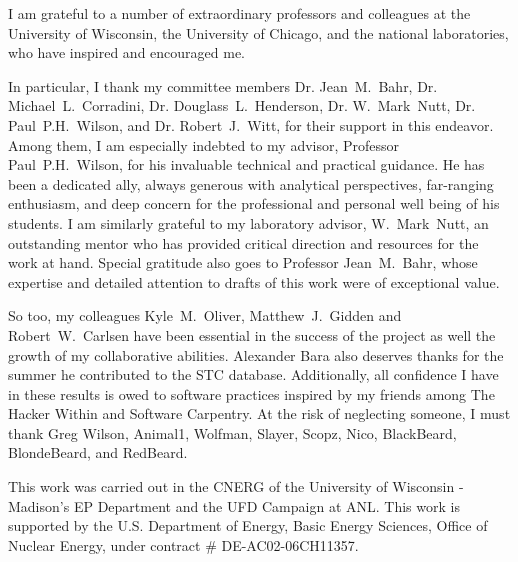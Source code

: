 I am grateful to a number of extraordinary professors and colleagues at the 
University of Wisconsin, the University of Chicago, and the national 
laboratories, who have inspired and encouraged me.  

In particular, I thank my committee members Dr. Jean~M.~Bahr, Dr. 
Michael~L.~Corradini, Dr. Douglass~L.~Henderson, Dr. W.~Mark~Nutt, Dr. 
Paul~P.H.~Wilson, and Dr. Robert~J.~Witt, for their support in this endeavor.  
Among them, I am especially indebted to my advisor, Professor Paul~P.H.~Wilson, 
for his invaluable technical and practical guidance. He has been a dedicated 
ally, always generous with analytical perspectives, far-ranging enthusiasm, 
and deep concern for the professional and personal well being of his 
students. I am similarly grateful to my laboratory advisor, W.~Mark~Nutt, an 
outstanding mentor who has provided critical direction and resources for the 
work at hand. Special gratitude also goes to Professor Jean~M.~Bahr, whose 
expertise and detailed attention to drafts of this work were of exceptional 
value.  

So too, my colleagues Kyle~M.~Oliver, Matthew~J.~Gidden and Robert~W.~Carlsen 
have been essential in the success of the \Cyclus project as well the growth of 
my collaborative abilities. Alexander Bara also deserves thanks for the summer 
he contributed to the STC database. Additionally, all confidence I have in 
these results is owed to software practices inspired by my friends among The 
Hacker Within and Software Carpentry. At the risk of neglecting someone, I must 
thank Greg Wilson, Animal1, Wolfman, Slayer, Scopz, Nico,  BlackBeard, 
BlondeBeard, and RedBeard.

This work was carried out in the \gls{CNERG} of the University of Wisconsin - 
Madison's \gls{EP} Department and the \gls{UFD} Campaign at \gls{ANL}. This 
work is supported by the U.S. Department of Energy, Basic Energy Sciences, 
Office of Nuclear Energy, under contract \# DE-AC02-06CH11357.
